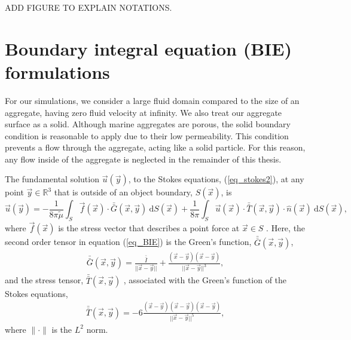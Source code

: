 {\color{red} ADD FIGURE TO EXPLAIN NOTATIONS.}
%
\section{Boundary integral equation (BIE) formulations} 
For our simulations, we consider a large fluid domain compared to the size of an aggregate, having zero fluid velocity at infinity. We also treat our aggregate surface as a solid. Although marine aggregates are porous, the solid boundary condition is reasonable to apply due to their low permeability. 
This condition prevents a flow through the aggregate, acting like a solid particle. For this reason, any flow inside of the aggregate is neglected in the remainder of this thesis.  
\par
The fundamental solution $\vec{u}(\vec{y})$, to the Stokes equations, (\ref{eq_stokes2}), at any point $\vec{y} \in \mathbb{R}^3$ that is outside of an object boundary, $S(\vec{x})$, is
\begin{equation}
   \vec{u}(\vec{y}) =
	- \frac{1}{8 \pi {\tilde{\mu}}} \int_S  \vec{f}(\vec{x}) \cdot \bar{\bar{G}}(\vec{x},\vec{y}) \ \text{d}S(\vec{x}) 
+ \frac{1}{8 \pi} \int_S
\vec{u}(\vec{x}) \cdot  \bar{\bar{T}}(\vec{x},\vec{y})  
\cdot \hat{n} ( \vec{x})
\ \text{d}S(\vec{x}),
\label{eq_BIE}
\end{equation}
where  $\vec{f}(\vec{x})$ is the stress vector that describes a point force at $\vec{x} \in S$ \cite{pozrikidis_boundary_1992}. Here, the second order tensor in equation (\ref{eq_BIE}) is the Green's function,  $\bar{\bar{G}}(\vec{x},\vec{y})$,
\begin{align}
  \bar{\bar{G}}(\vec{x},\vec{y}) =   
  \frac{\bar{\bar{I}}}{||\vec{x}-\vec{y}||} + \frac{(\vec{x}-\vec{y})(\vec{x}-\vec{y})}{||\vec{x}-\vec{y}||^3},
  \label{eq_stokeslet}
  \end{align}
  and the stress tensor, $\bar{\bar{T}}(\vec{x},\vec{y})$ , associated with the Green's function of the Stokes equations,
  \begin{align}
  \bar{\bar{T}}(\vec{x},\vec{y}) = 
  -6\frac{(\vec{x}-\vec{y})(\vec{x}-\vec{y}) (\vec{x}-\vec{y})}{||\vec{x}-\vec{y}||^5},
  \label{eq_stresslet}
  \end{align}
where $\| \cdot \|$ is the $L^2$ norm. 
